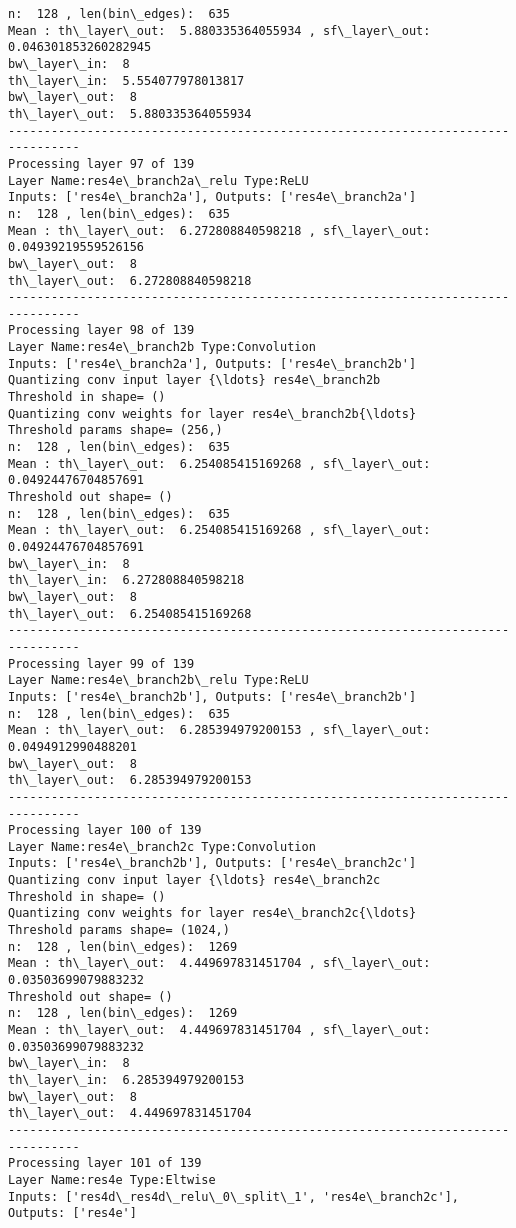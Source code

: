 \documentclass[11pt]{article}
\begin{document}
\begin{Verbatim}[commandchars=\\\{\}]
n:  128 , len(bin\_edges):  635
Mean : th\_layer\_out:  5.880335364055934 , sf\_layer\_out:  0.046301853260282945
bw\_layer\_in:  8
th\_layer\_in:  5.554077978013817
bw\_layer\_out:  8
th\_layer\_out:  5.880335364055934
--------------------------------------------------------------------------------
Processing layer 97 of 139
Layer Name:res4e\_branch2a\_relu Type:ReLU
Inputs: ['res4e\_branch2a'], Outputs: ['res4e\_branch2a']
n:  128 , len(bin\_edges):  635
Mean : th\_layer\_out:  6.272808840598218 , sf\_layer\_out:  0.04939219559526156
bw\_layer\_out:  8
th\_layer\_out:  6.272808840598218
--------------------------------------------------------------------------------
Processing layer 98 of 139
Layer Name:res4e\_branch2b Type:Convolution
Inputs: ['res4e\_branch2a'], Outputs: ['res4e\_branch2b']
Quantizing conv input layer {\ldots} res4e\_branch2b
Threshold in shape= ()
Quantizing conv weights for layer res4e\_branch2b{\ldots}
Threshold params shape= (256,)
n:  128 , len(bin\_edges):  635
Mean : th\_layer\_out:  6.254085415169268 , sf\_layer\_out:  0.04924476704857691
Threshold out shape= ()
n:  128 , len(bin\_edges):  635
Mean : th\_layer\_out:  6.254085415169268 , sf\_layer\_out:  0.04924476704857691
bw\_layer\_in:  8
th\_layer\_in:  6.272808840598218
bw\_layer\_out:  8
th\_layer\_out:  6.254085415169268
--------------------------------------------------------------------------------
Processing layer 99 of 139
Layer Name:res4e\_branch2b\_relu Type:ReLU
Inputs: ['res4e\_branch2b'], Outputs: ['res4e\_branch2b']
n:  128 , len(bin\_edges):  635
Mean : th\_layer\_out:  6.285394979200153 , sf\_layer\_out:  0.0494912990488201
bw\_layer\_out:  8
th\_layer\_out:  6.285394979200153
--------------------------------------------------------------------------------
Processing layer 100 of 139
Layer Name:res4e\_branch2c Type:Convolution
Inputs: ['res4e\_branch2b'], Outputs: ['res4e\_branch2c']
Quantizing conv input layer {\ldots} res4e\_branch2c
Threshold in shape= ()
Quantizing conv weights for layer res4e\_branch2c{\ldots}
Threshold params shape= (1024,)
n:  128 , len(bin\_edges):  1269
Mean : th\_layer\_out:  4.449697831451704 , sf\_layer\_out:  0.03503699079883232
Threshold out shape= ()
n:  128 , len(bin\_edges):  1269
Mean : th\_layer\_out:  4.449697831451704 , sf\_layer\_out:  0.03503699079883232
bw\_layer\_in:  8
th\_layer\_in:  6.285394979200153
bw\_layer\_out:  8
th\_layer\_out:  4.449697831451704
--------------------------------------------------------------------------------
Processing layer 101 of 139
Layer Name:res4e Type:Eltwise
Inputs: ['res4d\_res4d\_relu\_0\_split\_1', 'res4e\_branch2c'], Outputs: ['res4e']

\end{Verbatim}
\end{document}
